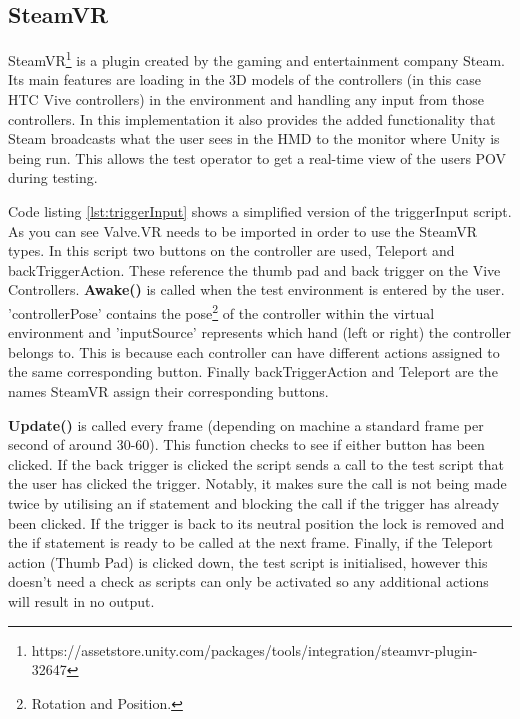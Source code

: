 \documentclass{l4proj}
\begin{document}
\subsection{SteamVR} \label{SteamVR}
SteamVR\footnote{https://assetstore.unity.com/packages/tools/integration/steamvr-plugin-32647} is a plugin created by the gaming and entertainment company Steam. Its main features are loading in the 3D models of the controllers (in this case HTC Vive controllers) in the environment and handling any input from those controllers. In this implementation it also provides the added functionality that Steam broadcasts what the user sees in the HMD to the monitor where Unity is being run. This allows the test operator to get a real-time view of the users POV during testing.

Code listing \ref{lst:triggerInput} shows a simplified version of the triggerInput script. As you can see Valve.VR needs to be imported in order to use the SteamVR types. In this script two buttons on the controller are used, Teleport and backTriggerAction. These reference the thumb pad and back trigger on the Vive Controllers. \textbf{Awake()} is called when the test environment is entered by the user. 'controllerPose' contains the pose\footnote{Rotation and Position.} of the controller within the virtual environment and 'inputSource' represents which hand (left or right) the controller belongs to. This is because each controller can have different actions assigned to the same corresponding button. Finally backTriggerAction and Teleport are the names SteamVR assign their corresponding buttons.

\textbf{Update()} is called every frame (depending on machine a standard frame per second of around 30-60). This function checks to see if either button has been clicked. If the back trigger is clicked the script sends a call to the test script that the user has clicked the trigger. Notably, it makes sure the call is not being made twice by utilising an if statement and blocking the call if the trigger has already been clicked. If the trigger is back to its neutral position the lock is removed and the if statement is ready to be called at the next frame. Finally, if the Teleport action (Thumb Pad) is clicked down, the test script is initialised, however this doesn't need a check as scripts can only be activated so any additional actions will result in no output. 
\end{document}
